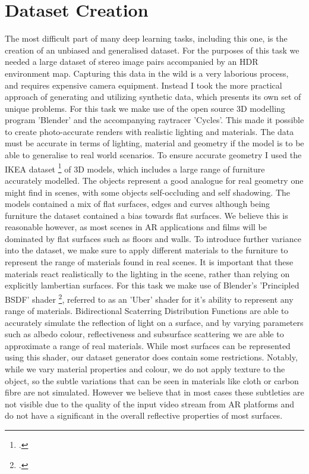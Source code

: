\documentclass[ %
                    author={Gavin Parker},
                supervisor={Dr. Neill Campbell},
                    degree={MEng},
                     title={Deep Siamese Networks for Illumination Estimation from Stereo Images},
                  subtitle={},
                      type={research},
                      year={2018} ]{dissertation}
\begin{document}
\section{Dataset Creation}
The most difficult part of many deep learning tasks, including this one, is the creation of an unbiased and generalised dataset. For the purposes of this task we needed a large dataset of stereo image pairs accompanied by an HDR environment map. Capturing this data in the wild is a very laborious process, and requires expensive camera equipment. Instead I took the more practical approach of generating and utilizing synthetic data, which presents its own set of unique problems. For this task we make use of the open source 3D modelling program 'Blender' and the accompanying raytracer 'Cycles'. This made it possible to create photo-accurate renders with realistic lighting and materials. The data must be accurate in terms of lighting, material and geometry if the model is to be able to generalise to real world scenarios. To ensure accurate geometry I used the IKEA dataset \footcite{http://ikea.csail.mit.edu/} of 3D models, which includes a large range of furniture accurately modelled. The objects represent a good analogue for real geometry one might find in scenes, with some objects self-occluding and self shadowing. The models contained a mix of flat surfaces, edges and curves although being furniture the dataset contained a bias towards flat surfaces. We believe this is reasonable however, as most scenes in AR applications and films will be dominated by flat surfaces such as floors and walls.
\newline
To introduce further variance into the dataset, we make sure to apply different materials to the furniture to represent the range of materials found in real scenes. It is important that these materials react realistically to the lighting in the scene, rather than relying on explicitly lambertian surfaces. For this task we make use of Blender's 'Principled BSDF' shader \footcite{https://docs.blender.org/manual/en/dev/render/cycles/nodes/types/shaders/principled.html}, referred to as an 'Uber' shader for it's ability to represent any range of materials. Bidirectional Scaterring Distribution Functions are able to accurately simulate the reflection of light on a surface, and by varying parameters such as albedo colour, reflectiveness and subsurface scattering we are able to approximate a range of real materials. While most surfaces can be represented using this shader, our dataset generator does contain some restrictions. Notably, while we vary material properties and colour, we do not apply texture to the object, so the subtle variations that can be seen in materials like cloth or carbon fibre are not simulated. However we believe that in most cases these subtleties are not visible due to the quality of the input video stream from AR platforms and do not have a significant in the overall reflective properties of most surfaces.
\end{document}
